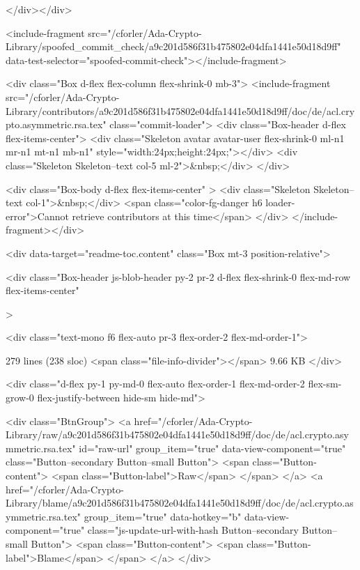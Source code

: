   
</div></div>

    <include-fragment src="/cforler/Ada-Crypto-Library/spoofed_commit_check/a9c201d586f31b475802e04dfa1441e50d18d9ff" data-test-selector="spoofed-commit-check"></include-fragment>

    <div class="Box d-flex flex-column flex-shrink-0 mb-3">
  <include-fragment src="/cforler/Ada-Crypto-Library/contributors/a9c201d586f31b475802e04dfa1441e50d18d9ff/doc/de/acl.crypto.asymmetric.rsa.tex" class="commit-loader">
    <div class="Box-header d-flex flex-items-center">
      <div class="Skeleton avatar avatar-user flex-shrink-0 ml-n1 mr-n1 mt-n1 mb-n1" style="width:24px;height:24px;"></div>
      <div class="Skeleton Skeleton--text col-5 ml-2">&nbsp;</div>
    </div>

    <div class="Box-body d-flex flex-items-center" >
      <div class="Skeleton Skeleton--text col-1">&nbsp;</div>
      <span class="color-fg-danger h6 loader-error">Cannot retrieve contributors at this time</span>
    </div>
</include-fragment></div>








  
    <div data-target="readme-toc.content" class="Box mt-3 position-relative">
      
  <div
    class="Box-header js-blob-header py-2 pr-2 d-flex flex-shrink-0 flex-md-row flex-items-center"
    
  >


  <div class="text-mono f6 flex-auto pr-3 flex-order-2 flex-md-order-1">

      279 lines (238 sloc)
      <span class="file-info-divider"></span>
    9.66 KB
  </div>

  <div class="d-flex py-1 py-md-0 flex-auto flex-order-1 flex-md-order-2 flex-sm-grow-0 flex-justify-between hide-sm hide-md">
      

    <div class="BtnGroup">
        <a href="/cforler/Ada-Crypto-Library/raw/a9c201d586f31b475802e04dfa1441e50d18d9ff/doc/de/acl.crypto.asymmetric.rsa.tex" id="raw-url" group_item="true" data-view-component="true" class="Button--secondary Button--small Button">    <span class="Button-content">
      <span class="Button-label">Raw</span>
    </span>
</a>  
          <a href="/cforler/Ada-Crypto-Library/blame/a9c201d586f31b475802e04dfa1441e50d18d9ff/doc/de/acl.crypto.asymmetric.rsa.tex" group_item="true" data-hotkey="b" data-view-component="true" class="js-update-url-with-hash Button--secondary Button--small Button">    <span class="Button-content">
      <span class="Button-label">Blame</span>
    </span>
</a>  
    </div>

